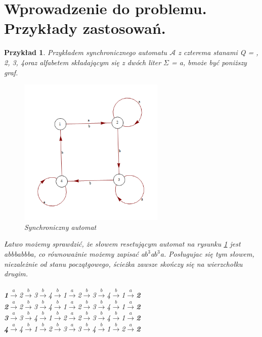 \documentclass[12pt,a4paper]{article}
\newtheorem{pr}{Przyk{\l}ad}[section]
\begin{document}
\section{Wprowadzenie do problemu. Przyk{\l}ady zastosowa\'{n}.}

\begin{pr}
\label{pr:przyklad1}
Przyk{\l}adem synchronicznego automatu  $\mathscr{A}$ z czterema stanami Q = , 2, 3, 4\textbraceright  oraz alfabetem sk{\l}adaj\k{a}cym si\k{e} z dw\'{o}ch liter $\Sigma$ = \textbraceleft a, b\textbraceright  mo\.{z}e by\'c poni\.{z}szy graf.
\begin{figure}[H]
    \centering
    \includegraphics[width=0.62\textwidth]{rysunek1}
    \caption{Synchroniczny automat}
    \label{fig:rysunek1}
\end{figure}

{\L}atwo mo\.{z}emy sprawdzi\'{c}, \.{z}e s{\l}owem resetuj\k{a}cym automat na rysunku \ref{fig:rysunek1} jest \textit{abbbabbba}, co r\'{o}wnowa\.{z}nie mo\.{z}emy zapisa\'{c} \textit{a$b^{3}$a$b^{3}$a}. Pos{\l}ugujac si\k{e} tym s{\l}owem, niezale\.{z}nie od stanu pocz\k{a}tgowego, \'{s}cie\.{z}ka zawsze sko\'{n}czy si\k{e} na wierzcho{\l}ku drugim.\\
\\
\textbf{1}$\xrightarrow{a}$2$\xrightarrow{b}$3$\xrightarrow{b}$4$\xrightarrow{b}$1$\xrightarrow{a}$2$\xrightarrow{b}$3$\xrightarrow{b}$4$\xrightarrow{b}$1$\xrightarrow{a}$\textbf{2}\\
\textbf{2}$\xrightarrow{a}$2$\xrightarrow{b}$3$\xrightarrow{b}$4$\xrightarrow{b}$1$\xrightarrow{a}$2$\xrightarrow{b}$3$\xrightarrow{b}$4$\xrightarrow{b}$1$\xrightarrow{a}$\textbf{2}\\
\textbf{3}$\xrightarrow{a}$3$\xrightarrow{b}$4$\xrightarrow{b}$1$\xrightarrow{b}$2$\xrightarrow{a}$2$\xrightarrow{b}$3$\xrightarrow{b}$4$\xrightarrow{b}$1$\xrightarrow{a}$\textbf{2}\\
\textbf{4}$\xrightarrow{a}$4$\xrightarrow{b}$1$\xrightarrow{b}$2$\xrightarrow{b}$3$\xrightarrow{a}$3$\xrightarrow{b}$4$\xrightarrow{b}$1$\xrightarrow{b}$2$\xrightarrow{a}$\textbf{2}
\end{pr}
\end{document}
